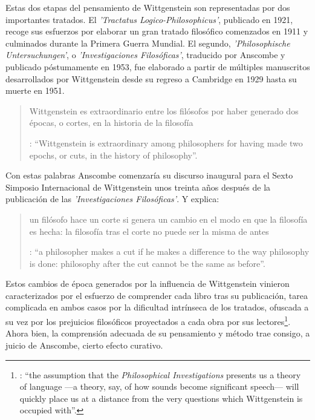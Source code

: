 Estas dos etapas del pensamiento de Wittgenstein son representadas por dos importantes tratados. El \emph{'Tractatus Logico-Philosophicus'}, publicado en 1921, recoge sus esfuerzos por elaborar un gran tratado filosófico comenzados en 1911 y culminados durante la Primera Guerra Mundial. El segundo, \emph{'Philosophische Untersuchungen'}, o \emph{'Investigaciones Filosóficas'}, traducido por Anscombe y publicado póstumamente en 1953, fue elaborado a partir de múltiples manuscritos desarrollados por Wittgenstein desde su regreso a Cambridge en 1929 hasta su muerte en 1951.

\blockquote[{\Cite[181]{anscombe2011plato:twocuts}}: \enquote{Wittgenstein is extraordinary among philosophers for having made two epochs, or cuts, in the history of philosophy}.]{Wittgenstein es extraordinario entre los filósofos por haber generado dos épocas, o cortes, en la historia de la filosofía}. Con estas palabras Anscombe comenzaría su discurso inaugural para el Sexto Simposio Internacional de Wittgenstein unos treinta años después de la publicación de las \emph{'Investigaciones Filosóficas'}. Y explica: \blockquote[{\Cite[181]{anscombe2011plato:twocuts}}: \enquote{a philosopher makes a cut if he makes a difference to the way philosophy is done: philosophy after the cut cannot be the same as before}.]{un filósofo hace un corte si genera un cambio en el modo en que la filosofía es hecha: la filosofía tras el corte no puede ser la misma de antes}.

Estos cambios de época generados por la influencia de Wittgenstein vinieron caracterizados por el esfuerzo de comprender cada libro tras su publicación, tarea complicada en ambos casos por la dificultad intrínseca de los tratados, ofuscada a su vez por los prejuicios filosóficos proyectados a cada obra por sus lectores\footnote{\cite[Cf.][183]{anscombe2011plato:twocuts}: \enquote{the assumption that the \emph{Philosophical Investigations} presents us a theory of language ---a theory, say, of how sounds become significant speech--- will quickly place us at a distance from the very questions which Wittgenstein is occupied with}.}.
Ahora bien, la comprensión adecuada de su pensamiento y método trae consigo, a juicio de Anscombe, cierto efecto curativo.

